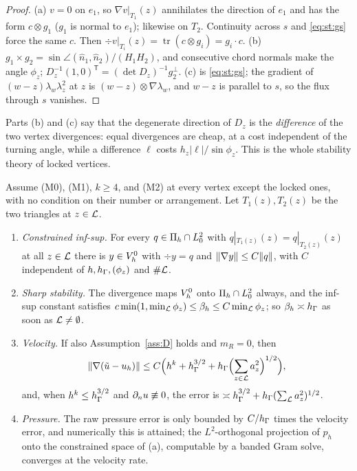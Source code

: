 \begin{proof}
(a) $v=0$ on $e_1$, so $\nabla v|_{T_1}(z)$ annihilates the direction of $e_1$ and has the form $c\otimes g_1$ ($g_1$ is normal to $e_1$); likewise on $T_2$. Continuity across $s$ and \eqref{eq:st:gs} force the same $c$. Then $\div v|_{T_i}(z)=\operatorname{tr}(c\otimes g_i)=g_i\cdot c$. (b) $g_1\times g_2=\sin\angle(\hat n_1,\hat n_2)/(H_1H_2)$, and consecutive chord normals make the angle $\phi_z$; $D_z^{-1}(1,0)^{\mathsf T}=(\det D_z)^{-1}g_2^\perp$. (c) is \eqref{eq:st:gs}; the gradient of $(w-z)\lambda_w\lambda_z^2$ at $z$ is $(w-z)\otimes\nabla\lambda_w$, and $w-z$ is parallel to $s$, so the flux through $s$ vanishes.
\end{proof}

Parts (b) and (c) say that the degenerate direction of $D_z$ is the \emph{difference} of the two vertex divergences: equal divergences are cheap, at a cost independent of the turning angle, while a difference $\ell$ costs $h_z|\ell|/\sin\phi_z$. This is the whole stability theory of locked vertices.

\begin{theorem}\label{thm:st:locks}
Assume (M0), (M1), $k\ge4$, and (M2) at every vertex except the locked ones, with no condition on their number or arrangement. Let $T_1(z),T_2(z)$ be the two triangles at $z\in\mathcal L$.
\begin{enumerate}[label=(\alph*)]
\item \emph{Constrained inf-sup.} For every $q\in\Pi_h\cap L^2_0$ with $q|_{T_1(z)}(z)=q|_{T_2(z)}(z)$ at all $z\in\mathcal L$ there is $y\in V_h^0$ with $\div y=q$ and $\lVert \nabla y\rVert\le C\lVert q\rVert$, with $C$ independent of $h,h_\Gamma,(\phi_z)$ and $\#\mathcal L$.
\item \emph{Sharp stability.} The divergence maps $V_h^0$ onto $\Pi_h\cap L^2_0$ always, and the inf-sup constant satisfies $c\min(1,\min_{\mathcal L}\phi_z)\le\beta_h\le C\min_{\mathcal L}\phi_z$; so $\beta_h\asymp h_\Gamma$ as soon as $\mathcal L\ne\emptyset$.
\item \emph{Velocity.} If also Assumption~\ref{ass:D} holds and $m_R=0$, then
\[
\lVert \nabla(\tilde u-u_h)\rVert\le C\Bigl(h^k+h_\Gamma^{3/2}+h_\Gamma\Bigl(\sum_{z\in\mathcal L}a_z^2\Bigr)^{1/2}\Bigr),
\]
and, when $h^k\le h_\Gamma^{3/2}$ and $\partial_n u\not\equiv0$, the error is $\asymp h_\Gamma^{3/2}+h_\Gamma(\sum_{\mathcal L}a_z^2)^{1/2}$.
\item \emph{Pressure.} The raw pressure error is only bounded by $C/h_\Gamma$ times the velocity error, and numerically this is attained; the $L^2$-orthogonal projection of $p_h$ onto the constrained space of (a), computable by a banded Gram solve, converges at the velocity rate.
\end{enumerate}
\end{theorem}

